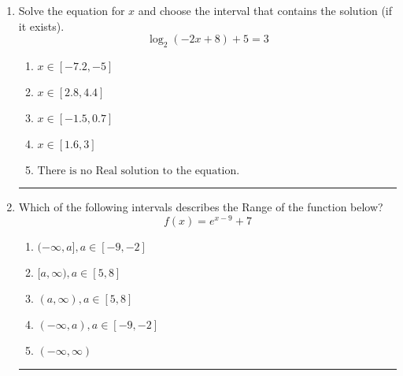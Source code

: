 \documentclass[14pt]{extbook}
\newcommand{\litem}[1]{\item#1\hspace*{-1cm}\rule{\textwidth}{0.4pt}}
\begin{document}
\begin{enumerate}
{\begin{enumerate}[label=\Alph*.]
\end{enumerate} }
\litem{
Solve the equation for $x$ and choose the interval that contains the solution (if it exists).\[ \log_{2}{(-2x+8)}+5 = 3 \]\begin{enumerate}[label=\Alph*.]
\item \( x \in [-7.2, -5] \)
\item \( x \in [2.8, 4.4] \)
\item \( x \in [-1.5, 0.7] \)
\item \( x \in [1.6, 3] \)
\item \( \text{There is no Real solution to the equation.} \)

\end{enumerate} }
\litem{
Which of the following intervals describes the Range of the function below?\[ f(x) = e^{x-9}+7 \]\begin{enumerate}[label=\Alph*.]
\item \( (-\infty, a], a \in [-9, -2] \)
\item \( [a, \infty), a \in [5, 8] \)
\item \( (a, \infty), a \in [5, 8] \)
\item \( (-\infty, a), a \in [-9, -2] \)
\item \( (-\infty, \infty) \)

\end{enumerate} }
\end{enumerate}
\end{document}
